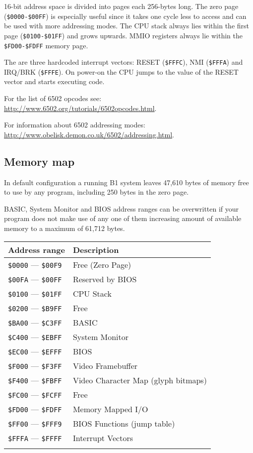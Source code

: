 \documentclass[a4paper,10pt,oneside]{article}
\begin{document}
16-bit address space is divided into pages each 256-bytes long. The zero page (\texttt{\$0000-\$00FF}) is especially useful since it takes one cycle less to access and can be used with more addressing modes. The CPU stack always lies within the first page (\texttt{\$0100-\$01FF}) and grows upwards. MMIO registers always lie within the \texttt{\$FD00-\$FDFF} memory page.

The are three hardcoded interrupt vectors: RESET (\texttt{\$FFFC}), NMI (\texttt{\$FFFA}) and IRQ/BRK (\texttt{\$FFFE}). On power-on the CPU jumps to the value of the RESET vector and starts executing code.

For the list of 6502 opcodes see: \url{http://www.6502.org/tutorials/6502opcodes.html}.

For information about 6502 addressing modes: \url{http://www.obelisk.demon.co.uk/6502/addressing.html}.

\subsection{Memory map}
In default configuration a running B1 system leaves 47,610 bytes of memory free to use by any program, including 250 bytes in the zero page.

BASIC, System Monitor and BIOS address ranges can be overwritten if your program does not make use of any one of them increasing amount of available memory to a maximum of 61,712 bytes. \vspace{5pt}

\begin{center}
  \begin{tabularx}{\textwidth}{ l | X }
    \textbf{Address range} & \textbf{Description} \\ \hline
    \texttt{\$0000} --- \texttt{\$00F9} & Free (Zero Page) \\
    \texttt{\$00FA} --- \texttt{\$00FF} & Reserved by BIOS \\
    \texttt{\$0100} --- \texttt{\$01FF} & CPU Stack \\
    \texttt{\$0200} --- \texttt{\$B9FF} & Free \\
    \texttt{\$BA00} --- \texttt{\$C3FF} & BASIC \\
    \texttt{\$C400} --- \texttt{\$EBFF} & System Monitor \\
    \texttt{\$EC00} --- \texttt{\$EFFF} & BIOS \\
    \texttt{\$F000} --- \texttt{\$F3FF} & Video Framebuffer \\
    \texttt{\$F400} --- \texttt{\$FBFF} & Video Character Map (glyph bitmaps) \\
    \texttt{\$FC00} --- \texttt{\$FCFF} & Free \\
    \texttt{\$FD00} --- \texttt{\$FDFF} & Memory Mapped I/O \\
    \texttt{\$FF00} --- \texttt{\$FFF9} & BIOS Functions (jump table) \\
    \texttt{\$FFFA} --- \texttt{\$FFFF} & Interrupt Vectors \\
    \caption{Memory map}
  \end{tabularx}
\end{center}
\end{document}
